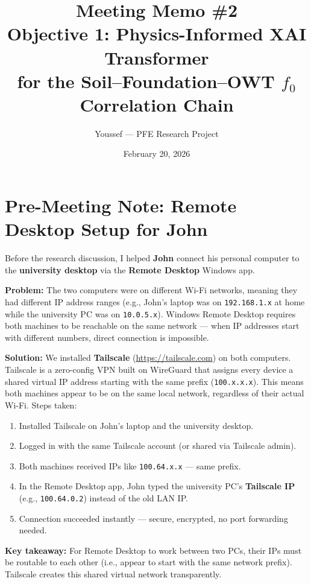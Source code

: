 \documentclass[11pt,a4paper]{article}
\title{%
  \textbf{Meeting Memo \#2} \\[6pt]
  \large Objective 1: Physics-Informed XAI Transformer \\
  for the Soil--Foundation--OWT $f_0$ Correlation Chain
}
\author{Youssef --- PFE Research Project}
\date{February 20, 2026}
\begin{document}
\maketitle

\section*{Pre-Meeting Note: Remote Desktop Setup for John}

\begin{tcolorbox}[colback=blue!5, colframe=blue!50!black, title=IT Support Note]
Before the research discussion, I helped \textbf{John} connect his personal computer
to the \textbf{university desktop} via the \textbf{Remote Desktop} Windows app.

\textbf{Problem:} The two computers were on different Wi-Fi networks, meaning they
had different IP address ranges (e.g., John's laptop was on \texttt{192.168.1.x}
at home while the university PC was on \texttt{10.0.5.x}). Windows Remote Desktop
requires both machines to be reachable on the same network --- when IP addresses
start with different numbers, direct connection is impossible.

\textbf{Solution:} We installed \textbf{Tailscale} (\url{https://tailscale.com}) on
both computers. Tailscale is a zero-config VPN built on WireGuard that assigns
every device a shared virtual IP address starting with the same prefix
(\texttt{100.x.x.x}). This means both machines appear to be on the same local network,
regardless of their actual Wi-Fi. Steps taken:

\begin{enumerate}[noitemsep]
  \item Installed Tailscale on John's laptop and the university desktop.
  \item Logged in with the same Tailscale account (or shared via Tailscale admin).
  \item Both machines received IPs like \texttt{100.64.x.x} --- same prefix.
  \item In the Remote Desktop app, John typed the university PC's \textbf{Tailscale IP}
        (e.g., \texttt{100.64.0.2}) instead of the old LAN IP.
  \item Connection succeeded instantly --- secure, encrypted, no port forwarding needed.
\end{enumerate}

\textbf{Key takeaway:} For Remote Desktop to work between two PCs, their IPs must be
routable to each other (i.e., appear to start with the same network prefix).
Tailscale creates this shared virtual network transparently.
\end{tcolorbox}
\end{document}
